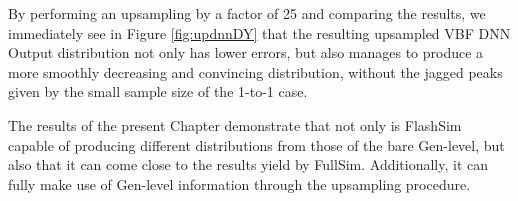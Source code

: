    By performing an upsampling by a factor of 25 and comparing the results, we immediately see in Figure \ref{fig:updnnDY} that the resulting upsampled VBF DNN Output distribution not only has lower errors, but also manages to produce a more smoothly decreasing and convincing distribution, without the jagged peaks given by the small sample size of the 1-to-1 case.
   
  The results of the present Chapter demonstrate that not only is FlashSim capable of producing different distributions from those of the bare Gen-level, but also that it can come close to the results yield by FullSim. Additionally, it can fully make use of Gen-level information through the upsampling procedure.